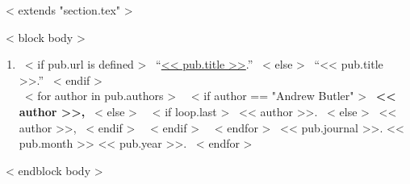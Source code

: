 ~< extends "section.tex" >~

~< block body >~
\begin{small}
  \begin{enumerate}
    \itemsep 1em
    ~< for pub in items >~
      \item{
        ~< if pub.url is defined >~
          ``\href{<< pub.url >>}{<< pub.title >>}.''
        ~< else >~
          ``<< pub.title >>.''
        ~< endif >~\\
      	~< for author in pub.authors >~
      		~< if author == "Andrew Butler" >~
      			\textbf{ << author >>, }
      		~< else >~
            ~< if loop.last >~
              << author >>. 
            ~< else >~
              << author >>, 
            ~< endif >~
          ~< endif >~
      	~< endfor >~
        << pub.journal >>.
        << pub.month >>
        << pub.year >>.
      }
    ~< endfor >~
  \end{enumerate}
\end{small}
~< endblock body >~
